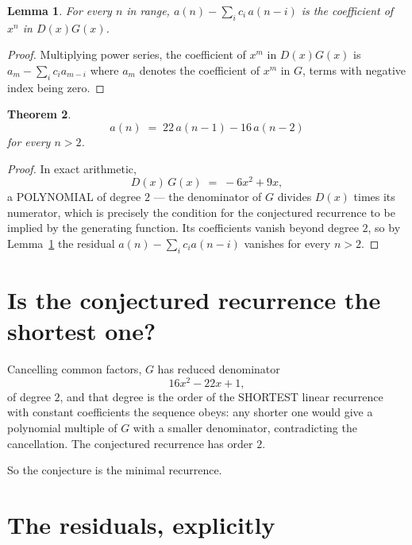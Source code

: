 \documentclass[11pt,a4paper]{article}
\theoremstyle{plain}
\newtheorem{theorem}{Theorem}
\newtheorem{lemma}[theorem]{Lemma}
\theoremstyle{definition}
\begin{document}
\begin{lemma}\label{lem:key}
For every $n$ in range, $a(n)-\sum_i c_i\,a(n-i)$ is the coefficient of $x^{n}$ in
$D(x)G(x)$.
\end{lemma}

\begin{proof}
Multiplying power series, the coefficient of $x^{m}$ in $D(x)G(x)$ is
$a_m-\sum_i c_i a_{m-i}$ where $a_m$ denotes the coefficient of $x^{m}$ in $G$, terms with
negative index being zero.
\end{proof}

\begin{theorem}
\[
a(n)\;=\;22\,a(n-1) - 16\,a(n-2)
\]
for every $n>2$.
\end{theorem}

\begin{proof}
In exact arithmetic,
\[
D(x)\,G(x)\;=\;- 6 x^{2} + 9 x,
\]
a POLYNOMIAL of degree $2$ --- the denominator of $G$ divides $D(x)$ times its numerator,
which is precisely the condition for the conjectured recurrence to be implied by the
generating function. Its coefficients vanish beyond degree $2$, so by
Lemma~\ref{lem:key} the residual $a(n)-\sum_ic_ia(n-i)$ vanishes for every
$n>2$.
\end{proof}

\section{Is the conjectured recurrence the shortest one?}

Cancelling common factors, $G$ has reduced denominator
\[
16 x^{2} - 22 x + 1,
\]
of degree $2$, and that degree is the order of the SHORTEST linear recurrence with
constant coefficients the sequence obeys: any shorter one would give a polynomial multiple of
$G$ with a smaller denominator, contradicting the cancellation. The conjectured recurrence has
order $2$.

So the conjecture is the minimal recurrence.

\section{The residuals, explicitly}
\end{document}
